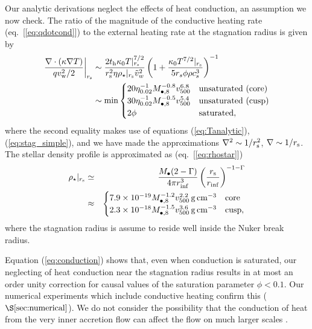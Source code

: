 \documentclass[usenatbib,fleqn]{mn2e}
\newcommand{\rs}{r_s}
\begin{document}
Our analytic derivations neglect the effects of heat conduction, an
assumption we now check.  The ratio of the magnitude of the conductive
heating rate (eq.~[\ref{eq:qdotcond}]) to the external heating rate at
the stagnation radius is given by
\begin{align}
  \left.\frac{\nabla\cdot(\kappa \nabla T)}{q v_{\rm
w}^{2}/2}\right|_{r_{\rm s}} &\sim \frac{2t_{\rm h}\kappa_0
T|_{r_{\rm s}}^{7/2}}{r_{\rm s}^{2}\eta \rho_{\star}|_{r_{\rm s}}
\tilde{v}_{w}^{2}}
 \left(1+\frac{\kappa_0 T^{7/2}|_{r_{\rm s}}}{5 \rs
    \phi \rho c_s^3}\right)^{-1}
\nonumber \\ &\sim {\rm min}
  \begin{cases}
  20 \eta_{0.02}^{-1}
M_{\bullet,8}^{-0.8} v_{500}^{6.8} &  \text{unsaturated (core)}\\
 30 \eta_{0.02}^{-1}
M_{\bullet,8}^{-0.5} v_{500}^{5.4} &  \text{unsaturated (cusp)}\\
  2 \phi & \text{saturated},
  \end{cases}
 \label{eq:conduction}
\end{align}
where the second equality makes use of equations (\ref{eq:Tanalytic}),
(\ref{eq:stag_simple}), and we have made the approximations $\nabla^{2} \sim
1/r_{\rm s}^{2}$, $\nabla \sim 1/r_{\rm s}$.  The
stellar density profile is approximated as (eq.~[\ref{eq:rhostar}])
\begin{eqnarray}
  \rho_{\star}|_{r_{\rm s}} &\simeq& \frac{M_{\bullet}(2-\Gamma)}{4\pi r_{\rm inf}^{3}}\left(\frac{r_{\rm s}}{r_{\rm inf}}\right)^{-1-\Gamma} \nonumber \\
 &\approx& \begin{cases}
    7.9 \times 10^{-19}M_{\bullet,8}^{-1.2}v_{500}^{2.2}\,{\rm g\,cm^{-3}}
    & \text{core} \\
    2.3 \times 10^{-18} M_{\bullet,8}^{-1.5}v_{500}^{3.6}
    \,{\rm g\,cm^{-3}}  & \text{cusp}, 
  \end{cases}
  \label{eq:rhostarrs}
\end{eqnarray}
where the stagnation radius is assume to reside well inside the Nuker
break radius.  

Equation (\ref{eq:conduction}) shows that, even when conduction is
saturated, our neglecting of heat conduction near the stagnation
radius results in at most an order unity correction for causal values
of the saturation parameter $\phi < 0.1$.  Our numerical experiments
which include conductive heating confirm this
($\S\ref{sec:numerical}$).  We do not consider the possibility that
the conduction of heat from the very inner accretion flow can affect
the flow on much larger scales \citep{Johnson+2007}. 
\end{document}
